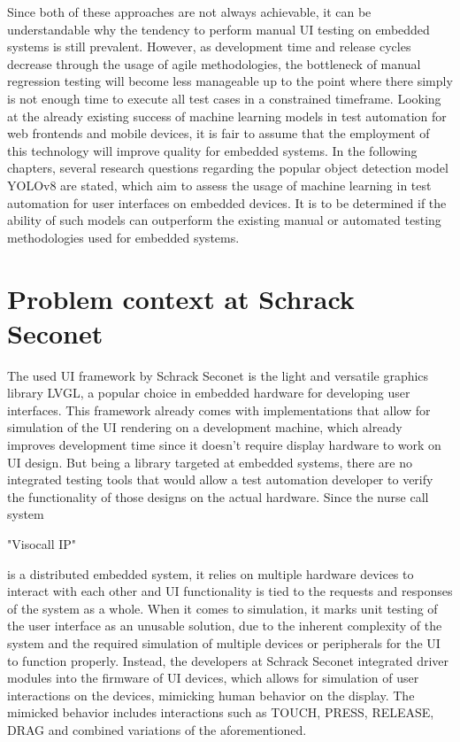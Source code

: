 \documentclass[Proposal,BIC,english,IEEE]{BASE/twbook} %
\begin{document}
Since both of these approaches are not always achievable, it can be understandable why the tendency to perform manual UI testing on embedded systems is still prevalent.
However, as development time and release cycles decrease through the usage of agile methodologies, the bottleneck of manual regression testing will become less manageable up to the point where there simply is not enough time to execute all test cases in a constrained timeframe.
Looking at the already existing success of machine learning models in test automation for web frontends and mobile devices, it is fair to assume that the employment of this technology will improve quality for embedded systems. In the following chapters, several research questions regarding the popular object detection model YOLOv8 are stated, which aim to assess the usage of machine learning in test automation for user interfaces on embedded devices. It is to be determined if the ability of such models can outperform the existing manual or automated testing methodologies used for embedded systems.
\section{Problem context at Schrack Seconet}
The used UI framework by Schrack Seconet is the light and versatile graphics library LVGL, a popular choice in embedded hardware for developing user interfaces. This framework already comes with implementations that allow for simulation of the UI rendering on a development machine, which already improves development time since it doesn't require display hardware to work on UI design.
But being a library targeted at embedded systems, there are no integrated testing tools that would allow a test automation developer to verify the functionality of those designs on the actual hardware. Since the nurse call system \begin{em}"Visocall IP"\end{em} is a distributed embedded system, it relies on multiple hardware devices to interact with each other and UI functionality is tied to the requests and responses of the system as a whole.
When it comes to simulation, it marks unit testing of the user interface as an unusable solution, due to the inherent complexity of the system and the required simulation of multiple devices or peripherals for the UI to function properly.
Instead, the developers at Schrack Seconet integrated driver modules into the firmware of UI devices, which allows for simulation of user interactions on the devices, mimicking human behavior on the display. The mimicked behavior includes interactions such as TOUCH, PRESS, RELEASE, DRAG and combined variations of the aforementioned.
\end{document}
